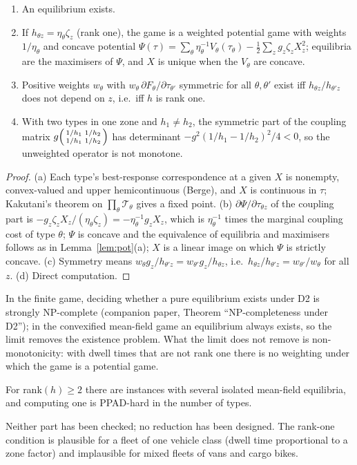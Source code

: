 \begin{proposition}\label{prop:d2}
\begin{enumerate}
\item[(a)] An equilibrium exists.
\item[(b)] If $h_{\theta z}=\eta_\theta\zeta_z$ (rank one), the game is a weighted potential game with weights $1/\eta_\theta$ and concave potential $\Psi(\tau)=\sum_\theta\eta_\theta^{-1}V_\theta(\tau_\theta)-\tfrac12\sum_zg_z\zeta_zX_z^2$; equilibria are the maximisers of $\Psi$, and $X$ is unique when the $V_\theta$ are concave.
\item[(c)] Positive weights $w_\theta$ with $w_\theta\,\partial F_\theta/\partial\tau_{\theta'}$ symmetric for all $\theta,\theta'$ exist iff $h_{\theta z}/h_{\theta'z}$ does not depend on $z$, i.e.\ iff $h$ is rank one.
\item[(d)] With two types in one zone and $h_1\ne h_2$, the symmetric part of the coupling matrix $g\begin{psmallmatrix}1/h_1&1/h_2\\1/h_1&1/h_2\end{psmallmatrix}$ has determinant $-g^2(1/h_1-1/h_2)^2/4<0$, so the unweighted operator is not monotone.
\end{enumerate}
\end{proposition}
\begin{proof}
(a) Each type's best-response correspondence at a given $X$ is nonempty, convex-valued and upper hemicontinuous (Berge), and $X$ is continuous in $\tau$; Kakutani's theorem on $\prod_\theta\mathcal T_\theta$ gives a fixed point. (b) $\partial\Psi/\partial\tau_{\theta z}$ of the coupling part is $-g_z\zeta_zX_z/(\eta_\theta\zeta_z)=-\eta_\theta^{-1}g_zX_z$, which is $\eta_\theta^{-1}$ times the marginal coupling cost of type $\theta$; $\Psi$ is concave and the equivalence of equilibria and maximisers follows as in Lemma~\ref{lem:pot}(a); $X$ is a linear image on which $\Psi$ is strictly concave. (c) Symmetry means $w_\theta g_z/h_{\theta'z}=w_{\theta'}g_z/h_{\theta z}$, i.e.\ $h_{\theta z}/h_{\theta'z}=w_{\theta'}/w_\theta$ for all $z$. (d) Direct computation.
\end{proof}

In the finite game, deciding whether a pure equilibrium exists under D2 is strongly NP-complete (companion paper, Theorem ``NP-completeness under D2''); in the convexified mean-field game an equilibrium always exists, so the limit removes the existence problem. What the limit does not remove is non-monotonicity: with dwell times that are not rank one there is no weighting under which the game is a potential game.

\begin{conjecture}\label{conj:d2}
For rank$(h)\ge2$ there are instances with several isolated mean-field equilibria, and computing one is PPAD-hard in the number of types.
\end{conjecture}
Neither part has been checked; no reduction has been designed. The rank-one condition is plausible for a fleet of one vehicle class (dwell time proportional to a zone factor) and implausible for mixed fleets of vans and cargo bikes.
